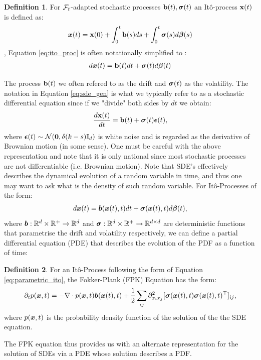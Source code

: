 \documentclass[a4paper,12pt,twoside,openright]{report}
\theoremstyle{definition}
\newtheorem{definition}{Definition}[section]
\begin{document}
\begin{definition}
    For ${\mathcal{F}}_t$-adapted stochastic processes ${\mathbf{b}}(t), {\bm{\sigma}}(t)$ an Itô-process ${\mathbf{x}}(t)$ is defined as:
    \begin{align}\label{eq:ito_proc}
    {\bm{x}}(t) = {\mathbf{x}}(0) + \int_{0}^t {\mathbf{b}}(s) ds + \int_0^t {\bm{\sigma}}(s) d{\bm{\beta}}(s)
    \end{align},
Equation \ref{eq:ito_proc} is often notationally simplified to :
    \begin{align}\label{eq:sde_gen}
        d{\bm{x}}(t) ={\mathbf{b}}(t) dt + {\bm{\sigma}}(t) d{\bm{\beta}}(t)
    \end{align}
\end{definition}
The process ${\mathbf{b}}(t)$ we often refered to as the drift and ${\bm{\sigma}}(t)$ as the volatility. The notation in Equation \ref{eq:sde_gen} is what we typically refer to as a stochastic differential equation since if we "divide" both sides by $dt$ we obtain:
\begin{align*}
    \frac{d {\mathbf{x}}(t)}{dt} = {\mathbf{b}}(t) + {\bm{\sigma}}(t) {\bm{\epsilon}}(t),
\end{align*}
where ${\bm{\epsilon}}(t) \sim {\mathcal{N}}({\bm{0}}, \delta(k-s){\mathbb{I}_d})$ is white noise and is regarded as the derivative of Brownian motion (in some sense). One must be careful with the above representation and note that it is only national since most stochastic processes are not differentiable (i.e. Brownian motion).
Note that SDE's effectively describes the dynamical evolution of a random variable in time, and thus one may want to ask what is the density of such random variable. For Itô-Processes of the form:
\begin{align}\label{eq:parametric_ito}
     d{\bm{x}}(t) ={\bm{b}}({\bm{x}}(t), t) dt + {\bm{\sigma}}({\bm{x}}(t), t) d{\bm{\beta}}(t),
\end{align}
where ${\bm{b}} : {\mathbb{R}}^d \times {\mathbb{R}}^{+} \rightarrow {\mathbb{R}}^d$ and ${\bm{\sigma}} : {\mathbb{R}}^d \times {\mathbb{R}}^{+} \rightarrow {\mathbb{R}}^{d\times d}$ are deterministic functions that parametrise the drift and volatility respectively, we can define a partial differential equation (PDE) that describes the evolution of the PDF as a function of time:
\begin{definition}\label{def:fpk}
    For an Itô-Process following the form of Equation \ref{eq:parametric_ito}, the Fokker-Plank (FPK) Equation has the form:
    \begin{align}\label{eq:fpk}
        \partial_{t} p({\bm{x}}, t) =-\nabla \cdot p({\bm{x}}, t){\bm{b}}({\bm{x}}(t), t) + \frac{1}{2} \sum_{ij} \partial^2_{{x_i}{x_j}}[{\bm{\sigma}}({\bm{x}}(t), t){\bm{\sigma}}({\bm{x}}(t), t)^{\top}]_{ij},
    \end{align}
    where $p({\bm{x}}, t)$ is the probability density function of the solution of the the SDE equation.
\end{definition}
The FPK equation thus provides us with an alternate representation for the solution of SDEs via a PDE whose solution describes a PDF.
\end{document}
